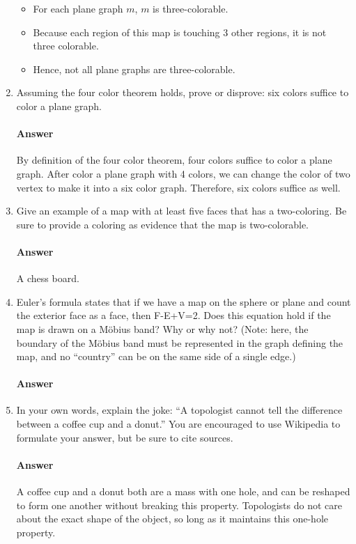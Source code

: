 \documentclass{article}
\begin{document}
\begin{enumerate}
    \begin{itemize}
        \item For each plane graph $m$, $m$ is three-colorable.
        \item Because each region of this map is touching 3 other regions, it is not three colorable.
        \item Hence, not all plane graphs are three-colorable.
    \end{itemize}

    \item Assuming the four color theorem holds, prove or disprove: six colors
        suffice to color a plane graph.

        \paragraph{Answer}
        By definition of the four color theorem, four colors suffice to color a plane graph. After color a plane graph with 4 colors, we can change the color of two vertex to make it into a six color graph. Therefore, six colors suffice as well.

    \item Give an example of a map with at least five faces that has a
        two-coloring.  Be sure to provide a coloring as evidence that the map is
        two-colorable.

        \paragraph{Answer}
        A chess board.

    \item Euler's formula states that if we have a map on the sphere or plane
        and count the exterior face as a face, then F-E+V=2.  Does this equation
        hold if the map is drawn on a M\"obius band? Why or why not? (Note:
        here, the boundary of the M\"obius band must be represented in the graph
        defining the map, and no ``country'' can be on the same side of a single
        edge.)

        \paragraph{Answer}

    \item In your own words, explain the joke: ``A topologist cannot tell the
        difference between a coffee cup and a donut.''  You are encouraged to
        use Wikipedia to formulate your answer, but be sure to cite sources.

        \paragraph{Answer}
        A coffee cup and a donut both are a mass with one hole, and can be reshaped to form one another without breaking this property. Topologists do not care about the exact shape of the object, so long as it maintains this one-hole property.

\end{enumerate}
\end{document}
